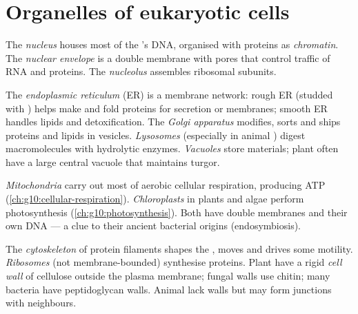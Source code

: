 \section{Organelles of eukaryotic cells}

\begin{definition}[Nucleus]\label{def:g10:the-cell:nucleus}
The \emph{nucleus} houses most of the 's DNA,
organised with proteins as \emph{chromatin}. The
\emph{nuclear envelope} is a double membrane
with pores that control traffic of RNA and proteins. The
\emph{nucleolus} assembles ribosomal subunits.
\end{definition}

\begin{definition}\label{def:g10:the-cell:endomembrane}
The \emph{endoplasmic reticulum} (ER) is a
membrane network: rough ER (studded with ) helps make and fold
proteins for secretion or membranes; smooth ER handles lipids and
detoxification. The \emph{Golgi
apparatus} modifies, sorts and ships proteins and
lipids in vesicles. \emph{Lysosomes} (especially in
animal ) digest macromolecules with hydrolytic enzymes.
\emph{Vacuoles} store materials; plant  often have a
large central vacuole that maintains turgor.
\end{definition}

\begin{definition}\label{def:g10:the-cell:energy-organelles}
\emph{Mitochondria} carry out most of aerobic
cellular respiration, producing ATP
(\cref{ch:g10:cellular-respiration}). \emph{Chloroplasts}
in plants and algae perform photosynthesis
(\cref{ch:g10:photosynthesis}). Both have double membranes and their own
DNA --- a clue to their ancient bacterial origins (endosymbiosis).
\end{definition}

\begin{definition}\label{def:g10:the-cell:support}
The \emph{cytoskeleton} of protein filaments shapes
the , moves  and drives some motility.
\emph{Ribosomes} (not membrane-bounded) synthesise
proteins. Plant  have a rigid \emph{cell wall} of
cellulose outside the plasma membrane; fungal walls use chitin; many
bacteria have peptidoglycan walls. Animal  lack walls but may form
junctions with neighbours.
\end{definition}

